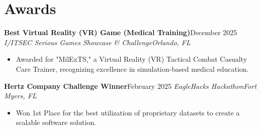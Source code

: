 \documentclass[letterpaper,11pt]{article}
\newcommand{\resumeEntry}[4]{
    \vspace{2pt}
    \noindent\textbf{#1}\hfill{#2}
    \newline
    \noindent\textit{#3}\hfill\textit{#4}
    \vspace{-3pt}
}
\newcommand{\resumeItemListStart}{\begin{itemize}[label=$\bullet$, leftmargin=1.1em, itemsep=0pt, parsep=0pt, topsep=2pt]}
\newcommand{\resumeItemListEnd}{\end{itemize}}
\begin{document}
\section{Awards}
    \resumeEntry
        {Best Virtual Reality (VR) Game (Medical Training)}
        {December 2025}
        {I/ITSEC Serious Games Showcase \& Challenge}
        {Orlando, FL}
    \resumeItemListStart
        \item Awarded for "MilExTS," a Virtual Reality (VR) Tactical Combat Casualty Care Trainer, recognizing excellence in simulation-based medical education.
    \resumeItemListEnd
    
    \resumeEntry
        {Hertz Company Challenge Winner}
        {February 2025}
        {EagleHacks Hackathon}
        {Fort Myers, FL}
    \resumeItemListStart
        \item Won 1st Place for the best utilization of proprietary datasets to create a scalable software solution.
    \resumeItemListEnd
\end{document}
